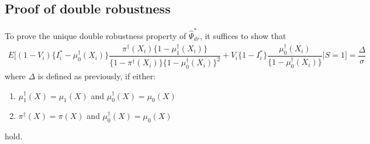 \begin{appendix}

\subsection{Proof of double robustness}\label{sec:dr}
To prove the unique double robustness property of $\widehat{\Psi}^*_{dr}$, it suffices to show that 
\begin{align*}
    E\bigg[(1 - V_i)\{I_i^* - \mu^\dagger_0(X_i)\}\dfrac{\pi^\dagger(X_i)\{1 - \mu^\dagger_1(X_i)\}}{\{1 - \pi^\dagger(X_i)\}\{1 - \mu^\dagger_0(X_i)\}^2} + V_i\{1-I_i^*\}\dfrac{\mu^\dagger_0(X_i)}{\{1 - \mu^\dagger_0(X_i)\}}\bigg| S=1\bigg] = \dfrac{\Delta}{\sigma}
\end{align*}
where $\Delta$ is defined as previously, if either:
\begin{enumerate}
    \item $\mu_1^\dagger(X) = \mu_1(X)$ and $\mu_0^\dagger(X) = \mu_0(X)$
    \item $\pi^\dagger(X) = \pi(X)$ and $\mu_0^\dagger(X) = \mu_0(X)$
\end{enumerate}
hold.
\vspace{2em}


\end{appendix}
